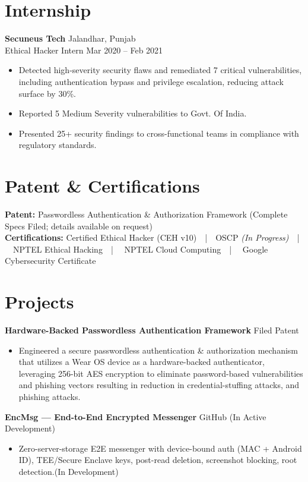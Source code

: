 \documentclass[10pt,a4paper]{article}
\begin{document}
\section{Internship}
\textbf{Secuneus Tech} \hfill Jalandhar, Punjab \\
{Ethical Hacker Intern} \hfill Mar 2020 -- Feb 2021
\begin{itemize}
    \item Detected high-severity security flaws and remediated 7 critical vulnerabilities, including authentication bypass and privilege escalation, reducing attack surface by 30\%.
    \item Reported 5 Medium Severity vulnerabilities to Govt. Of India.
    \item Presented 25+ security findings to cross-functional teams in compliance with regulatory standards.
\end{itemize}
\section{Patent \& Certifications}
\textbf{Patent:} Passwordless Authentication \& Authorization Framework (Complete Specs Filed; details available on request) \\
\noindent\textbf{Certifications:} Certified Ethical Hacker (CEH v10)\ \ |\ \ OSCP \textit{(In Progress)}\ \ |\ \ NPTEL Ethical Hacking\ \ | \ \ NPTEL Cloud Computing\ \ | \ \ Google Cybersecurity Certificate
\section{Projects}
\textbf{Hardware-Backed Passwordless Authentication Framework} \hfill {Filed Patent}
\begin{itemize}
    \item Engineered a secure passwordless authentication \& authorization mechanism that utilizes a Wear OS device as a hardware-backed authenticator, leveraging 256-bit AES  encryption to eliminate password-based vulnerabilities and phishing vectors resulting in reduction in credential-stuffing attacks, and phishing attacks.
\end{itemize}
\textbf{EncMsg --- End-to-End Encrypted Messenger}
\hfill{{GitHub (In Active Development)}}
\begin{itemize}
  \item Zero-server-storage E2E messenger with device-bound auth (MAC + Android ID), TEE/Secure Enclave keys, post-read deletion, screenshot blocking, root detection.(In Development)
\end{itemize}
\end{document}
